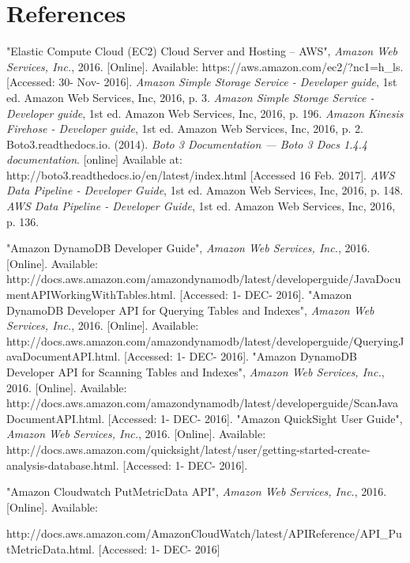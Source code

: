 \section{References}
\begin{thebibliography}{10}
   	"Elastic Compute Cloud (EC2) Cloud Server and Hosting – AWS", \textit{Amazon Web Services, Inc.}, 2016. [Online]. Available: https://aws.amazon.com/ec2/?nc1=h\_ls. [Accessed: 30- Nov- 2016].
    \textit{Amazon Simple Storage Service - Developer guide}, 1st ed. Amazon Web Services, Inc, 2016, p. 3.
  	\textit{Amazon Simple Storage Service - Developer guide}, 1st ed. Amazon Web Services, Inc, 2016, p. 196.
    \textit{Amazon Kinesis Firehose - Developer guide}, 1st ed. Amazon Web Services, Inc, 2016, p. 2.
  	 Boto3.readthedocs.io. (2014). \textit{Boto 3 Documentation — Boto 3 Docs 1.4.4 documentation}. [online] Available at: http://boto3.readthedocs.io/en/latest/index.html [Accessed 16 Feb. 2017].
  	\textit{AWS Data Pipeline - Developer Guide}, 1st ed. Amazon Web Services, Inc, 2016, p. 148.
  	\textit{AWS Data Pipeline - Developer Guide}, 1st ed. Amazon Web Services, Inc, 2016, p. 136.
  
  	"Amazon DynamoDB Developer Guide", \textit{Amazon Web Services, Inc.}, 2016. [Online]. Available: 	      http://docs.aws.amazon.com/amazondynamodb/latest/developerguide/JavaDocumentAPIWorkingWithTables.html. [Accessed: 1- DEC- 2016].
  	"Amazon DynamoDB Developer API for Querying Tables and Indexes", \textit{Amazon Web Services, Inc.}, 2016. [Online]. Available:
  http://docs.aws.amazon.com/amazondynamodb/latest/developerguide/QueryingJavaDocumentAPI.html. [Accessed: 1- DEC- 2016].
  	"Amazon DynamoDB Developer API for Scanning Tables and Indexes", \textit{Amazon Web Services, Inc.}, 2016. [Online]. Available:
  http://docs.aws.amazon.com/amazondynamodb/latest/developerguide/ScanJavaDocumentAPI.html. [Accessed: 1- DEC- 2016].
  	"Amazon QuickSight User Guide", \textit{Amazon Web Services, Inc.}, 2016. [Online]. Available:
  http://docs.aws.amazon.com/quicksight/latest/user/getting-started-create-analysis-database.html. [Accessed: 1- DEC- 2016].
  
	"Amazon Cloudwatch PutMetricData API", \textit{Amazon Web Services, Inc.}, 2016. [Online]. Available:
    
http://docs.aws.amazon.com/AmazonCloudWatch/latest/APIReference/API\_PutMetricData.html. [Accessed: 1- DEC- 2016]


\end{thebibliography}
